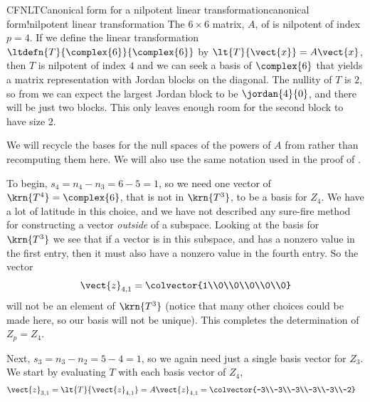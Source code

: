 \begin{example}{CFNLT}{Canonical form for a nilpotent linear transformation}{canonical form!nilpotent linear transformation}
The $6\times 6$ matrix, $A$, of  is nilpotent of index $p=4$.  If we define the linear transformation $\ltdefn{T}{\complex{6}}{\complex{6}}$ by $\lt{T}{\vect{x}}=A\vect{x}$, then $T$ is nilpotent of index $4$ and we can seek a basis of $\complex{6}$ that yields a matrix representation with Jordan blocks on the diagonal.  The nullity of $T$ is $2$, so from  we can expect the largest Jordan block to be $\jordan{4}{0}$, and there will be just two blocks.  This only leaves enough room for the second block to have size 2.\par
%
We will recycle the bases for the null spaces of the powers of $A$ from  rather than recomputing them here.  We will also use the same notation used in the proof of .\par
%
To begin, $s_4=n_4-n_3=6-5=1$, so we need one vector of $\krn{T^4}=\complex{6}$, that is not in $\krn{T^3}$, to be a basis for $Z_4$.  We have a lot of latitude in this choice, and we have not described any sure-fire method for constructing a vector {\em outside} of a subspace.  Looking at the basis for $\krn{T^3}$ we see that if a vector is in this subspace, and has a nonzero value in the first entry, then it must also have a nonzero value in the fourth entry.  So the vector
%
\begin{align*}
\vect{z}_{4,1}=\colvector{1\\0\\0\\0\\0\\0}
\end{align*}
%
will not be an element of $\krn{T^3}$  (notice that many other choices could be made here, so our basis will not be unique).  This completes the determination of $Z_p=Z_4$.\par
%
Next, $s_3=n_3-n_2=5-4=1$, so we again need just a single basis vector for $Z_3$.  We start by evaluating $T$ with each basis vector of $Z_4$,
%
\begin{align*}
\vect{z}_{3,1}&=\lt{T}{\vect{z}_{4,1}}=A\vect{z}_{4,1}=\colvector{-3\\-3\\-3\\-3\\-3\\-2}

\end{align*}
\end{example}
